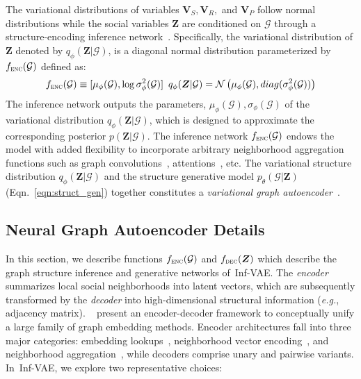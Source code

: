 \documentclass[sigconf]{acmart}
\newcommand{\name}{Inf-VAE}
\def\mV{{\bm{V}}}
\def\mZ{{\bm{Z}}}
\def\gG{{\mathcal{G}}}
\def\gN{{\mathcal{N}}}
\begin{document}
The variational distributions of variables $\mV_S, \mV_R,$ and $\mV_P$ follow normal distributions while the 
social variables $\mZ$ are conditioned on $\gG$ through a structure-encoding inference network~\cite{vae}.
Specifically, the variational distribution of $\mZ$ denoted by $q_{\phi}(\mZ | \gG)$, is a diagonal normal distribution parameterized by $f_{\textsc{enc}} (\gG)$ defined as:
\vspace{-2pt}
\begin{equation*}
f_{\textsc{enc}} (\gG) \equiv [\mu_{\phi}(\gG),  \log \sigma_{\phi}^2 (\gG)]  \hspace{5pt} q_{\phi} (\mZ | \gG) = \gN \left(\mu_{\phi}(\gG), diag( \sigma_{\phi}^2 (\gG))\right)
\end{equation*}
The inference network outputs the parameters, $\mu_{\phi}(\gG), \sigma_{\phi} (\gG)$ of the variational distribution $q_{\phi} (\mZ | \gG)$, which is designed to approximate the corresponding posterior $p(\mZ | \gG)$.
The inference network $f_{\textsc{enc}} (\gG)$
endows the model with added flexibility to incorporate arbitrary neighborhood aggregation functions such as graph convolutions~\cite{gcn}, attentions~\cite{gat}, etc.
The variational structure distribution $q_{\phi} (\mZ | \gG)$  and the structure generative model $p_{\theta} (\gG | \mZ)$ (Eqn.~\ref{eqn:struct_gen}) together constitutes a \emph{variational graph autoencoder}~\cite{vgae}.



\subsection{Neural Graph Autoencoder Details}
\label{sec:neural_vgae}
In this section, we describe functions $f_{\textsc{enc}} (\gG)$ and $f_{\textsc{dec}} (\mZ)$ which describe the graph structure inference and generative networks of~\name.
The \emph{encoder} summarizes local social
neighborhoods into latent vectors, which are subsequently transformed by the \emph{decoder} into high-dimensional structural information (\textit{e.g.}, adjacency matrix).
~\citet{graph_enc_dec} present an encoder-decoder framework to conceptually unify a large family of graph embedding methods.
Encoder architectures fall into three major categories: embedding lookups~\cite{deepwalk,node2vec}, neighborhood vector encoding~\cite{sdne}, and neighborhood aggregation~\cite{graphsage}, while decoders comprise unary and pairwise variants.
In~\name, we explore two representative choices:
\end{document}
